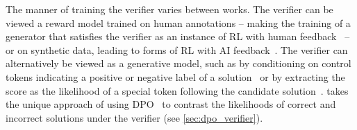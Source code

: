 The manner of training the verifier varies between works. The verifier can be viewed a reward model trained on human annotations -- making the training of a generator that satisfies the verifier as an instance of RL with human feedback~\citep{ziegler2019ft} -- or on synthetic data, leading to forms of RL with AI feedback~\citep{bai2022constitutional,yang2023rlcd}. The verifier can alternatively be viewed as a generative model, such as by conditioning on control tokens indicating a positive or negative label of a solution~\citep{korbak2023pretraining} or by extracting the score as the likelihood of a special token following the candidate solution~\citep{DBLP:journals/corr/abs-2310-10047}. \vstar{} takes the unique approach of using DPO~\citep{rafailov2023direct} to contrast the likelihoods of correct and incorrect solutions under the verifier (see \autoref{sec:dpo_verifier}).


